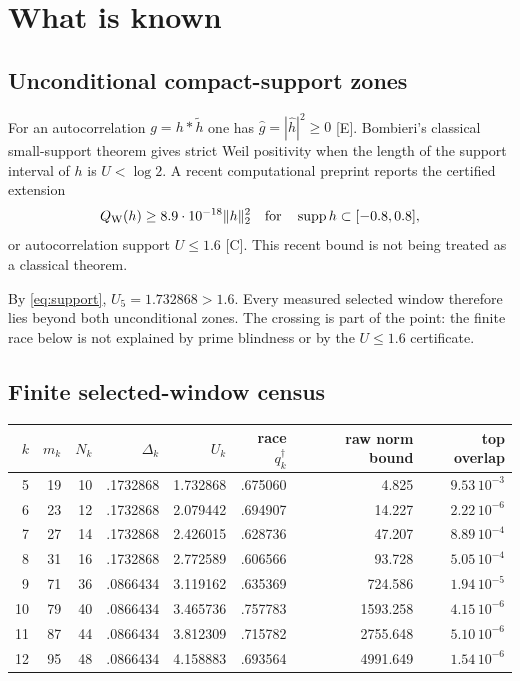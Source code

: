 \documentclass[11pt]{article}
\newcommand{\Egrade}{\textnormal{\small[E]}}
\newcommand{\Cgrade}{\textnormal{\small[C]}}
\begin{document}
\section{What is known}

\subsection{Unconditional compact-support zones}

For an autocorrelation $g=h*\widetilde h$ one has
$\widehat g=|\widehat h|^2\ge0$ \Egrade.  Bombieri's classical
small-support theorem gives strict Weil positivity when the length
of the support interval of $h$ is $U<\log2$.  A recent computational
preprint reports the certified extension
\[
 Q_{\rm W}(h)\ge8.9\cdot10^{-18}\|h\|_2^2
 \quad\text{for}\quad \operatorname{supp}h\subset[-0.8,0.8],
\]
or autocorrelation support $U\le1.6$ \Cgrade.  This recent bound is
not being treated as a classical theorem.

By \eqref{eq:support}, $U_5=1.732868>1.6$.  Every measured selected
window therefore lies beyond both unconditional zones.  The
crossing is part of the point: the finite race below is not explained
by prime blindness or by the $U\le1.6$ certificate.

\subsection{Finite selected-window census}

\begin{center}
\small
\begin{tabular}{@{}rrrrrrrr@{}}
\toprule
$k$ & $m_k$ & $N_k$ & $\Delta_k$ & $U_k$ & race $q_k^\dagger$
& raw norm bound & top overlap\\
\midrule
5  & 19 & 10 & .1732868 & 1.732868 & .675060 & 4.825 & $9.53\,10^{-3}$\\
6  & 23 & 12 & .1732868 & 2.079442 & .694907 & 14.227 & $2.22\,10^{-6}$\\
7  & 27 & 14 & .1732868 & 2.426015 & .628736 & 47.207 & $8.89\,10^{-4}$\\
8  & 31 & 16 & .1732868 & 2.772589 & .606566 & 93.728 & $5.05\,10^{-4}$\\
9  & 71 & 36 & .0866434 & 3.119162 & .635369 & 724.586 & $1.94\,10^{-5}$\\
10 & 79 & 40 & .0866434 & 3.465736 & .757783 & 1593.258 & $4.15\,10^{-6}$\\
11 & 87 & 44 & .0866434 & 3.812309 & .715782 & 2755.648 & $5.10\,10^{-6}$\\
12 & 95 & 48 & .0866434 & 4.158883 & .693564 & 4991.649 & $1.54\,10^{-6}$\\
\bottomrule
\end{tabular}
\end{center}
\end{document}
